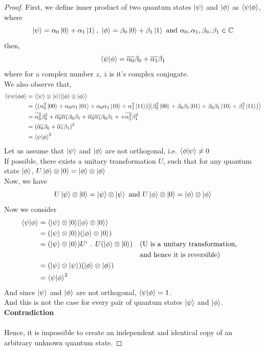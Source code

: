 \documentclass[a4paper]{article}
\begin{document}
\begin{proof}
First, we define inner product of two quantum states $\ket{\psi}$ and $\ket{\phi}$ as $\bra{\psi}\ket{\phi}$, where
$$\ket{\psi}=\alpha_{0}\ket{0}+\alpha_{1}\ket{1}\text{, }\ket{\phi}=\beta_{0}\ket{0}+\beta_{1}\ket{1}\text{ and }\alpha_{0},\alpha_{1},\beta_{0},\beta_{1}\in\mathbb{C}$$
then,
$$\bra{\psi}\ket{\phi}=\overline{\alpha_{0}}\beta_{0}+\overline{\alpha_{1}}\beta_{1}$$
where for a complex number $z$, $\overline{z}$ is it's complex conjugate.\\
We also observe that,
\begin{equation*}
\begin{split}
\bra{\psi\psi}\ket{\phi\phi} & = \bra{\ket{\psi}\otimes\ket{\psi}}\ket{\ket{\phi}\otimes\ket{\phi}} \\
& = \bra{(\alpha_{0}^{2}\ket{00}+\alpha_{0}\alpha_{1}\ket{01}+\alpha_{0}\alpha_{1}\ket{10}+\alpha_{1}^{2}\ket{11})}\ket{(\beta_{0}^{2}\ket{00}+\beta_{0}\beta_{1}\ket{01}+\beta_{0}\beta_{1}\ket{10}+\beta_{1}^{2}\ket{11})}\\
& = \overline{\alpha_{0}^{2}}\beta_{0}^{2}+\overline{\alpha_{0}\alpha_{1}}\beta_{0}\beta_{1}+\overline{\alpha_{0}\alpha_{1}}\beta_{0}\beta_{1}++\overline{\alpha_{1}^{2}}\beta_{1}^{2}\\
& = (\overline{\alpha_{0}}\beta_{0}+\overline{\alpha_{1}}\beta_{1})^{2}\\
& = \bra{\psi}\ket{\phi}^{2}
\end{split}
\end{equation*}
Let us assume that $\ket{\psi}$ and $\ket{\phi}$ are not orthogonal, i.e. $\bra{\phi}\ket{\psi}\neq0$\\
If possible, there exists a unitary transformation $U$, such that for any quantum state $\ket{\phi}$, $U\ket{\phi}\otimes\ket{0}=\ket{\phi}\otimes\ket{\phi}$\\
Now, we have
$$U\ket{\psi}\otimes\ket{0}=\ket{\psi}\otimes\ket{\psi}\text{ and }U\ket{\phi}\otimes\ket{0}=\ket{\phi}\otimes\ket{\phi}$$
Now we consider
\begin{align*}
\bra{\psi}\ket{\phi} & = \bra{\ket{\psi}\otimes\ket{0}}\ket{\ket{\phi}\otimes\ket{0}} \\
& = (\ket{\psi}\otimes\ket{0})(\ket{\phi}\otimes\ket{0}) \\
& = (\ket{\psi}\otimes\ket{0})U`\text{ . }U(\ket{\phi}\otimes\ket{0}) && \text{(U is a unitary transformation,} \\ &&& \text{and hence it is reversible)} \\
& = (\ket{\psi}\otimes\ket{\psi})(\ket{\phi}\otimes\ket{\phi}) \\
& = \bra{\psi}\ket{\phi}^{2}
\end{align*}
And since $\ket{\psi}$ and $\ket{\phi}$ are not orthogonal, $\bra{\psi}\ket{\phi}=1$. \\
And this is not the case for every pair of quantum states $\ket{\psi}$ and $\ket{\phi}$. \\
\textbf{Contradiction} \\ \\
Hence, it is impossible to create an independent and identical copy of an arbitrary unknown quantum state.
\end{proof}
\end{document}
